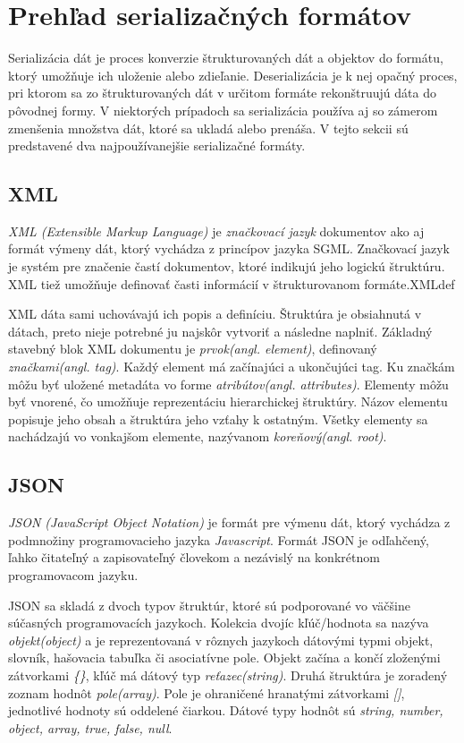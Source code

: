 \section{Prehľad serializačných formátov}
Serializácia dát je proces konverzie štrukturovaných dát a objektov do formátu, ktorý umožňuje ich uloženie alebo zdieľanie. Deserializácia je k nej opačný proces, pri ktorom sa zo štrukturovaných dát v určitom formáte rekonštruujú dáta do pôvodnej formy. V niektorých prípadoch sa serializácia používa aj so zámerom zmenšenia množstva dát, ktoré sa ukladá alebo prenáša. V tejto sekcii sú predstavené dva najpoužívanejšie serializačné formáty.        
\subsection*{XML}
\textit{XML (Extensible Markup Language)} je \textit{značkovací jazyk} dokumentov ako aj formát výmeny dát, ktorý vychádza z princípov jazyka SGML. Značkovací jazyk je systém pre značenie častí dokumentov, ktoré indikujú jeho logickú štruktúru. XML tiež umožňuje definovať časti informácií v štrukturovanom formáte.XMLdef

XML dáta sami uchovávajú ich popis a definíciu. Štruktúra je obsiahnutá v dátach, preto nieje potrebné ju najskôr vytvoriť a následne naplniť. Základný stavebný blok XML dokumentu je \textit{prvok(angl. element)}, definovaný \textit{značkami(angl. tag)}. Každý element má začínajúci a ukončujúci tag. Ku značkám môžu byť uložené metadáta vo forme \textit{atribútov(angl. attributes)}. Elementy môžu byť vnorené, čo umožňuje reprezentáciu hierarchickej štruktúry. Názov elementu popisuje jeho obsah a štruktúra jeho vzťahy k ostatným. Všetky elementy sa nachádzajú vo vonkajšom elemente, nazývanom \textit{koreňový(angl. root)}\cite{XMLdef}.      
\subsection*{JSON}
\textit{JSON (JavaScript Object Notation)} je formát pre výmenu dát, ktorý vychádza z podmnožiny programovacieho jazyka \textit{Javascript}. Formát JSON je odľahčený, ľahko čitateľný a zapisovateľný človekom a nezávislý na konkrétnom programovacom jazyku.

JSON sa skladá z dvoch typov štruktúr, ktoré sú podporované vo väčšine súčasných programovacích jazykoch. Kolekcia dvojíc kľúč/hodnota sa nazýva \textit{objekt(object)} a je reprezentovaná v rôznych jazykoch dátovými typmi objekt, slovník, hašovacia tabuľka či asociatívne pole. Objekt začína a končí zloženými zátvorkami \textit{\{\}}, kľúč má dátový typ \textit{reťazec(string)}. Druhá štruktúra je zoradený zoznam hodnôt \textit{pole(array)}. Pole je ohraničené hranatými zátvorkami \textit{[]}, jednotlivé hodnoty sú oddelené čiarkou. Dátové typy hodnôt sú \textit{string, number, object, array, true, false, null}\cite{JSONdef}.  

